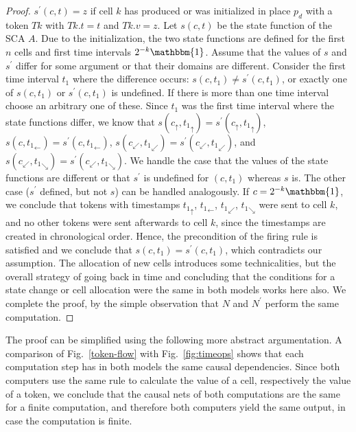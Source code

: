 \documentclass[pre,amssymb,showpacs,showkeys,preprint]{revtex4}
\begin{document}
\begin{proof}
$s^\prime(c,t) = z$ if cell $k$ has produced or was initialized in place $p_d$ with a token $\mathit{Tk}$ with $\mathit{Tk}.t = t$ and $\mathit{Tk}.v = z$.
Let $s(c,t)$ be the state function of the SCA $A$.
Due to the initialization, the two state functions are defined for the first $n$ cells and first time intervals $2^{-k} \mathbbm{1}$.
Assume that the values of $s$ and $s^\prime$ differ for some argument or that their domains are different.
Consider the first time interval $t_1$ where the difference occurs:
$s(c,t_1) \neq s^\prime(c,t_1)$, or exactly one of $s(c,t_1)$ or $s^\prime(c,t_1)$ is undefined.
If there is more than one time interval choose an arbitrary one of these.
Since $t_1$ was the first time interval where the state functions differ, we know that
$s(c_\uparrow, {t_1}_\uparrow) = s^\prime(c_\uparrow, {t_1}_\uparrow)$,
$s(c, {t_1}_\leftarrow) = s^\prime(c, {t_1}_\leftarrow)$,
$s(c_\swarrow, {t_1}_\swarrow) = s^\prime(c_\swarrow, {t_1}_\swarrow)$, and
$s(c_\swarrow, {t_1}_\searrow)= s^\prime(c_\swarrow, {t_1}_\searrow)$.
We handle the case that the values of the state functions are different or that $s^\prime$ is undefined for $(c,t_1)$ whereas $s$ is.
The other case ($s^\prime$ defined, but not $s$) can be handled analogously.
If $c = 2^{-k} \mathbbm{1}$, we conclude that tokens with timestamps ${t_1}_\uparrow$, ${t_1}_\leftarrow$, ${t_1}_\swarrow$, ${t_1}_\searrow$ were sent
to cell $k$, and no other tokens were sent afterwards to cell $k$, since the timestamps are created in
chronological order.
Hence, the precondition of the firing rule is satisfied and we conclude that $s(c,t_1) = s^\prime(c,t_1)$, which contradicts our assumption.
The allocation of new cells introduces some technicalities, but the overall strategy of going back in time
and concluding that the conditions for a state change or cell allocation were the same in both models works here also.
We complete the proof, by the simple observation that $N$ and $N^\prime$ perform the same computation.
\end{proof}
The proof can be simplified using the following more abstract argumentation.
A comparison of Fig.~\ref{token-flow} with Fig.~\ref{fig:timeops} shows that each computation step has in both models
the same causal dependencies.
Since both computers use the same rule to calculate the value of a cell, respectively the value of a token,
we conclude that the causal nets \cite{Levin81} of both computations are the same for a finite computation,
and therefore both computers yield the same output, in case the computation is finite.
\end{document}
